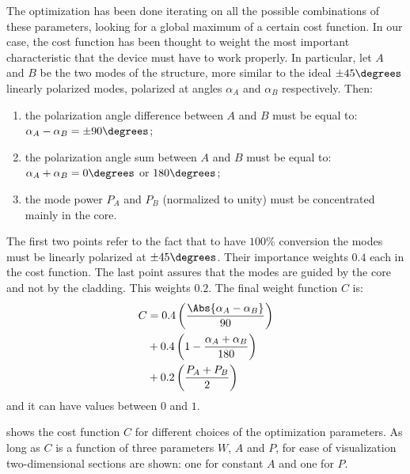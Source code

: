 The optimization has been done iterating on all the possible
combinations of these parameters, looking for a global maximum of a
certain cost function. In our case, the cost function has been thought
to weight the most important characteristic that the device must have
to work properly. In particular, let $A$ and $B$ be the two modes of
the structure, more similar to the ideal $\pm 45\degrees$ linearly
polarized modes, polarized at angles $\alpha_A$ and $\alpha_B$
respectively. Then:
\begin{enumerate}
\item
  the polarization angle difference between $A$ and $B$ must be equal
  to: $\alpha_A - \alpha_B = \pm 90\degrees$;
\item
  the polarization angle sum between $A$ and $B$ must be equal
  to: $\alpha_A + \alpha_B = 0\degrees$ or $180\degrees$;
\item
  the mode power $P_A$ and $P_B$ (normalized to unity) must be
  concentrated mainly in the core.
\end{enumerate}

The first two points refer to the fact that to have $100\%$ conversion
the modes must be linearly polarized at $\pm 45\degrees$. Their
importance weights $0.4$ each in the cost function. The last point
assures that the modes are guided by the core and not by the
cladding. This weights $0.2$. The final weight function $C$ is:
\begin{equation} \label{eqn:polrot_weight} \begin{split}
  C & = 0.4 \left( \frac{\Abs{\alpha_A - \alpha_B}}{90} \right) \\
    & + 0.4 \left( 1 - \frac{\alpha_A + \alpha_B}{180} \right) \\
    & + 0.2 \left( \frac{P_A + P_B}{2} \right)
\end{split} \end{equation}
and it can have values between $0$ and $1$.

 shows the cost function $C$ for
different choices of the optimization parameters. As long as $C$ is a
function of three parameters $W$, $A$ and $P$, for ease of
visualization two-dimensional sections are shown: one for constant $A$
and one for $P$.

